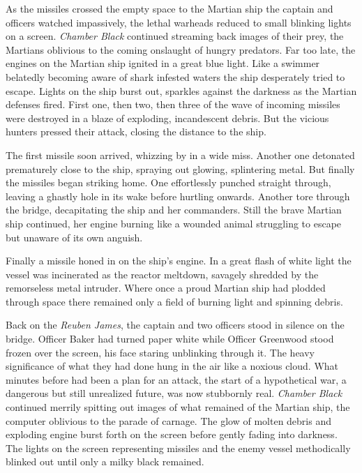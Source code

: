 \documentclass[12pt]{article} %
\begin{document}
As the missiles crossed the empty space to the Martian ship the captain and officers watched impassively, the lethal warheads reduced to small blinking lights on a screen. \textit{Chamber Black} continued streaming back images of their prey, the Martians oblivious to the coming onslaught of hungry predators. Far too late, the engines on the Martian ship ignited in a great blue light. Like a swimmer belatedly becoming aware of shark infested waters the ship desperately tried to escape. Lights on the ship burst out, sparkles against the darkness as the Martian defenses fired. First one, then two, then three of the wave of incoming missiles were destroyed in a blaze of exploding, incandescent debris. But the vicious hunters pressed their attack, closing the distance to the ship.

The first missile soon arrived, whizzing by in a wide miss. Another one detonated prematurely close to the ship, spraying out glowing, splintering metal. But finally the missiles began striking home. One effortlessly punched straight through, leaving a ghastly hole in its wake before hurtling onwards. Another tore through the bridge, decapitating the ship and her commanders. Still the brave Martian ship continued, her engine burning like a wounded animal struggling to escape but unaware of its own anguish.

Finally a missile honed in on the ship's engine. In a great flash of white light the vessel was incinerated as the reactor meltdown, savagely shredded by the remorseless metal intruder. Where once a proud Martian ship had plodded through space there remained only a field of burning light and spinning debris.

Back on the \textit{Reuben James}, the captain and two officers stood in silence on the bridge. Officer Baker had turned paper white while Officer Greenwood stood frozen over the screen, his face staring unblinking through it. The heavy significance of what they had done hung in the air like a noxious cloud. What minutes before had been a plan for an attack, the start of a hypothetical war, a dangerous but still unrealized future, was now stubbornly real. \textit{Chamber Black} continued merrily spitting out images of what remained of the Martian ship, the computer oblivious to the parade of carnage. The glow of molten debris and exploding engine burst forth on the screen before gently fading into darkness. The lights on the screen representing missiles and the enemy vessel methodically blinked out until only a milky black remained.
\end{document}

